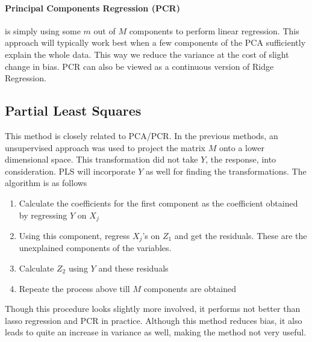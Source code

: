 \documentclass[../statistical_learning_notes.tex]{subfiles}
\begin{document}
    \paragraph{Principal Components Regression (PCR)}
    is simply using some $m$ out of $M$ components to perform linear regression. This approach will typically work best when a few components of the PCA sufficiently explain the whole data. This way we reduce the variance at the cost of slight change in bias. PCR can also be viewed as a continuous version of Ridge Regression.
    

    \subsection{Partial Least Squares}
    This method is closely related to PCA/PCR. In the previous methods, an unsupervised approach was used to project the matrix $M$ onto a lower dimensional space. This transformation did not take $Y$, the response, into consideration. PLS will incorporate $Y$ as well for finding the transformations.\newline
    The algorithm is as follows
    \begin{enumerate}
        \item Calculate the coefficients for the first component as the coefficient obtained by regressing $Y$ on $X_{j}$
        \item Using this component, regress $X_{j}$'s on $Z_{1}$ and get the residuals. These are the unexplained components of the variables.
        \item Calculate $Z_{2}$ using $Y$ and these residuals
        \item Repeate the process above till $M$ components are obtained
    \end{enumerate}

    Though this procedure looks slightly more involved, it performs not better than lasso regression and PCR in practice. Although this method reduces bias, it also leads to quite an increase in variance as well, making the method not very useful.

\end{document}
